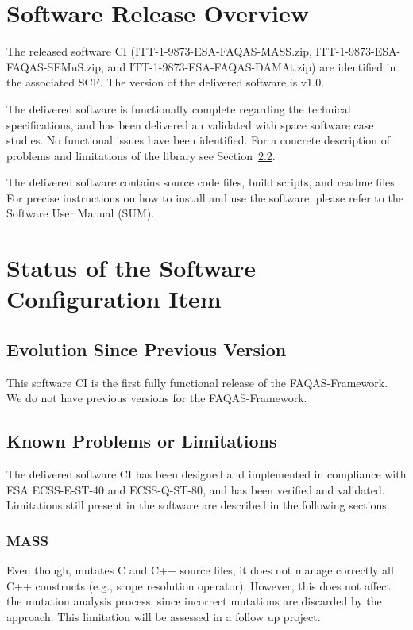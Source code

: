 
\chapter{Software Release Overview}

The released software CI (ITT-1-9873-ESA-FAQAS-MASS.zip, ITT-1-9873-ESA-FAQAS-SEMuS.zip, and ITT-1-9873-ESA-FAQAS-DAMAt.zip) are identified in the associated SCF. The version of the delivered software is v1.0.

The delivered software is functionally complete regarding the technical specifications, and has been delivered an validated with space software case studies. No functional issues have been identified. For a concrete description of problems and limitations of the library see Section~\ref{sec:limitations}.

The delivered software contains source code files, build scripts, and readme files. For precise instructions on how to install and use the software, please refer to the Software User Manual (SUM).


\chapter{Status of the Software Configuration Item}

\section{Evolution Since Previous Version}

This software CI is the first fully functional release of the FAQAS-Framework. We do not have previous versions for the FAQAS-Framework.

\section{Known Problems or Limitations}
\label{sec:limitations}

The delivered software CI has been designed and implemented in compliance with ESA ECSS-E-ST-40 and ECSS-Q-ST-80, and has been verified and validated. Limitations still present in the software are described in the following sections.

\subsection{MASS}

Even though, \MASS mutates C and C++ source files, it does not manage correctly all C++ constructs (e.g., scope resolution operator). However, this does not affect the mutation analysis process, since incorrect mutations are discarded by the approach. 
This limitation will be assessed in a follow up project.

